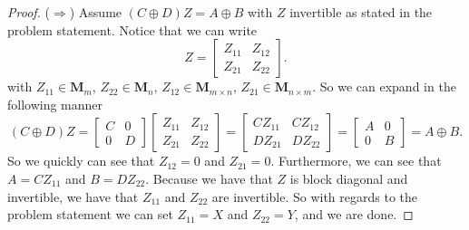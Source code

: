 \documentclass[12pt]{amsart}
\begin{document}
\begin{onehalfspace}
\begin{proof}
            ($\Rightarrow$) Assume $(C\oplus D)Z = A\oplus B$ with $Z$ invertible as stated in the problem statement.
            Notice that we can write
            \begin{displaymath}
                Z = \left[\begin{matrix}
                              Z_{11} & Z_{12}\\
                              Z_{21} & Z_{22}
                \end{matrix}\right].
            \end{displaymath}
            with $Z_{11}\in\mathbf{M}_m$, $Z_{22}\in\mathbf{M}_{n}$, $Z_{12}\in\mathbf{M}_{m\times n}$,
            $Z_{21}\in\mathbf{M}_{n\times m}$.
            So we can expand in the following manner
            \begin{displaymath}
                (C\oplus D)Z =
                \left[\begin{matrix}
                    C & 0\\
                    0 & D
                \end{matrix}\right]
                \left[\begin{matrix}
                    Z_{11} & Z_{12}\\
                    Z_{21} & Z_{22}
                \end{matrix}\right] =
                \left[\begin{matrix}
                          CZ_{11} & CZ_{12}\\
                          DZ_{21} & DZ_{22}
                \end{matrix}\right] =
                \left[\begin{matrix}
                          A & 0\\
                          0 & B
                \end{matrix}\right] = A\oplus B.
            \end{displaymath}
            So we quickly can see that $Z_{12} = 0$ and $Z_{21} = 0$.
            Furthermore, we can see that $A = CZ_{11}$ and $B=DZ_{22}$.
            Because we have that $Z$ is block diagonal and invertible, we have that $Z_{11}$ and $Z_{22}$ are invertible.
            So with regards to the problem statement we can set $Z_{11} = X$ and $Z_{22} = Y$, and we are done.
        \end{proof}


\end{onehalfspace}
\end{document}
